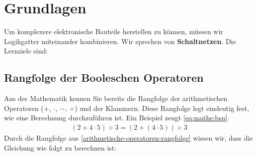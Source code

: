 
\toggletrue{image}
\toggletrue{imagehover}

\chapter{Grundlagen}
\label{ch:schaltnetze-grundlagen}

Um komplexere elektronische Bauteile herstellen zu können, müssen wir Logikgatter miteinander kombinieren. Wir sprechen von \textbf{Schaltnetzen}. Die Lernziele sind:\\


\section{Rangfolge der Booleschen Operatoren}

Aus der Mathematik kennen Sie bereits die Rangfolge der arithmetischen Operatoren ($+$, $\cdot$, $-$, $\div$) und der Klammern. Diese Rangfolge legt eindeutig fest, wie eine Berechnung durchzuführen ist. Ein Beispiel zeugt \autoref{eq:mathe:bsp}.
\begin{align}
(2 + 4 \cdot 5) \div 3 = (2 + (4 \cdot 5)) \div 3 \label{eq:mathe:bsp}
\end{align}
Durch die Rangfolge aus \autoref{arithmetische-operatoren-rangfolge} wissen wir, dass die Gleichung wie folgt zu berechnen ist:

